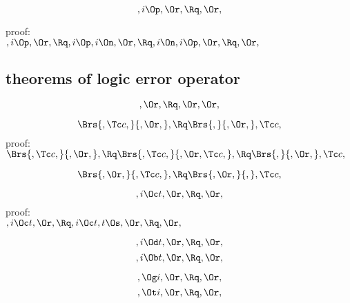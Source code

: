 \[,i \Op, \Or, \Rq ,\Or,\]

\bigskip
proof:\\
\begin{math} 
,i \Op, \Or, \\\\
\Rq,i \Op, i \On, \Or, \\\\
\Rq,i \On, i \Op, \Or, \\\\
\Rq, \Or,
\end{math}
\bigskip


\subsection{theorems of logic error operator}

\[, \Or, \Rq , \Or, \Or,\]


\[\Brs{,\Tc c,}{,\Or,} , \Rq \Brs{,}{,\Or,},\Tc c,\]
\bigskip
proof:\\
\begin{math} 
 \Brs{,\Tc c,}{,\Or,} ,\\\\
\Rq \Brs{,\Tc c,}{,\Or,\Tc c,} , \\\\
\Rq \Brs{,}{,\Or,} ,\Tc c,
\end{math}
\bigskip



\[\Brs{,\Or,}{,\Tc c,}, \Rq \Brs{,\Or,}{,},\Tc c,\]


\[,i \Oc t, \Or, \Rq ,\Or,\]
\bigskip
proof:\\
\begin{math} 
,i \Oc t, \Or,\\\\
\Rq ,i \Oc t,  t \Os, \Or, \\\\
\Rq ,\Or,
\end{math}
\bigskip


\[,i \Od t, \Or, \Rq ,\Or,\]
\[,i \Ob t, \Or, \Rq ,\Or,\]

\[, \Og i, \Or, \Rq ,\Or,\]
\[, \Ot i, \Or, \Rq ,\Or,\]



\newpage


